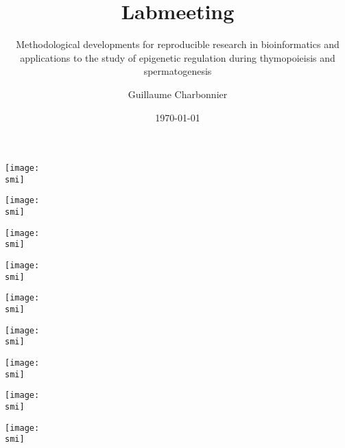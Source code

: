 \documentclass[10pt, notes]{beamer}
\title{Labmeeting}
\subtitle{Methodological developments for reproducible research in bioinformatics and applications to the study of epigenetic regulation during thymopoieisis and spermatogenesis}
\date{\today}
\author{Guillaume Charbonnier}
\institute{TAGC}
\def\smi{out/ln/updir/mw-gcthesis-oral/library.bib}
\begin{document}
\maketitle

\begin{frame}
  \def\smi{out/ln/updir/mw-gcthesis-oral/ink/Ulirsch2019-hsc-lymphoid-myeloid-lineages.pdf}
    \texttt{[image: \\smi]}
\end{frame}
\begin{frame}[plain]
  \def\smi{out/ln/updir/mw-gcthesis-oral/ink/Dogan2018-fig1/chromosome-territories.pdf}
    \texttt{[image: \\smi]}
\end{frame}
\begin{frame}[plain]
  \def\smi{out/ln/updir/mw-gcthesis-oral/ink/Dogan2018-fig1/ab-compartments.pdf}
    \texttt{[image: \\smi]}
\end{frame}
\begin{frame}[plain]
  \def\smi{out/ln/updir/mw-gcthesis-oral/ink/Dogan2018-fig1/tads.pdf}
    \texttt{[image: \\smi]}
\end{frame}
\begin{frame}[plain]
  \def\smi{out/ln/updir/mw-gcthesis-oral/ink/Dogan2018-fig1/chromatin-loops.pdf}
    \texttt{[image: \\smi]}
\end{frame}
\begin{frame}[plain]
  \def\smi{out/ln/updir/mw-gcthesis-oral/ink/Dogan2018-fig1/nucleosomes.pdf}
    \texttt{[image: \\smi]}
\end{frame}
\begin{frame}[plain]
  \def\smi{out/ln/updir/mw-gcthesis-oral/ink/Dogan2018-fig1/custom-layout.pdf}
    \texttt{[image: \\smi]}
\end{frame}
\begin{frame}[plain]
  \def\smi{out/ln/updir/mw-gcthesis-oral/ink/Dulac2010-mechanisms-involved-in-chromatin-modifications.pdf}
    \texttt{[image: \\smi]}
\end{frame}
\begin{frame}[plain]
  \def\smi{out/ln/updir/mw-gcthesis-oral/ink/Cedar2011/fig2-pluripotency-state.pdf}
    \texttt{[image: \\smi]}
\end{frame}
\end{document}
